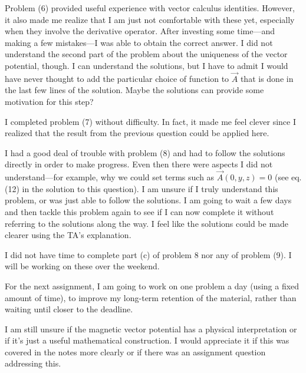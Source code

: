 \documentclass[11pt]{article}
\begin{document}
Problem (6) provided useful experience with vector calculus identities.  However, it also made me realize that I am just not comfortable with these yet, especially when they involve the derivative operator.  After investing some time---and making a few mistakes---I was able to obtain the correct answer.  I did not understand the second part of the problem about the uniqueness of the vector potential, though.  I can understand the solutions, but I have to admit I would have never thought to add the particular choice of function to $\vec{A}$ that is done in the last few lines of the solution. Maybe the solutions can provide some motivation for this step?

I completed problem (7) without difficulty.  In fact, it made me feel clever since I realized that the result from the previous question could be applied here.

I had a good deal of trouble with problem (8) and had to follow the solutions directly in order to make progress.  Even then there were aspects I did not understand---for example, why we could set terms such as $\vec{A}(0,y,z)=0$ (see eq. (12) in the solution to this question).  I am unsure if I truly understand this problem, or was just able to follow the solutions.  I am going to wait a few days and then tackle this problem again to see if I can now complete it without referring to the solutions along the way. I feel like the solutions could be made clearer using the TA's explanation.

I did not have time to complete part (c) of problem 8 nor any of problem (9).  I will be working on these over the weekend.

For the next assignment, I am going to work on one problem a day (using a fixed amount of time), to improve my long-term retention of the material, rather than waiting until closer to the deadline.

I am still unsure if the magnetic vector potential has a physical interpretation or if it's just a useful mathematical construction. I would appreciate it if this was covered in the notes more clearly or if there was an assignment question addressing this.
\end{document}
